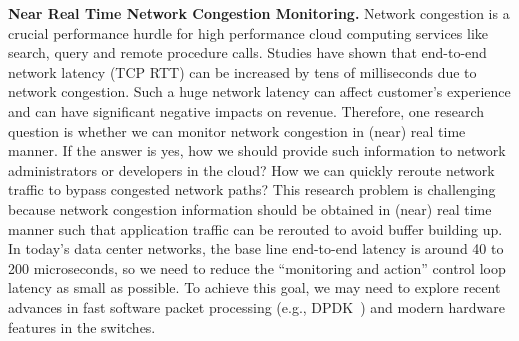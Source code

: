{\bf Near Real Time Network Congestion Monitoring.}
Network congestion is a crucial performance hurdle for high performance cloud computing services like 
search, query and remote procedure calls.
Studies have shown that end-to-end network latency (TCP RTT) can be increased by tens of milliseconds due to network congestion. Such a huge network latency can affect customer's experience and can have significant negative impacts on revenue.
Therefore, one research question is whether we can monitor network congestion in (near) real time manner.
If the answer is yes, how we should provide such information to network administrators or developers
in the cloud? How we can quickly reroute network traffic to bypass congested network paths?
This research problem is challenging because network congestion information should be obtained in
(near) real time manner such that application traffic can be rerouted to avoid buffer building up.
In today's data center networks, the base line end-to-end latency is around 40 to
200 microseconds, so we need to reduce the ``monitoring and action''
control loop latency as small as possible.
To achieve this goal, we may need to explore recent advances in fast software packet processing 
(e.g., DPDK~\cite{intel-dpdk}) and modern hardware features in the switches.

